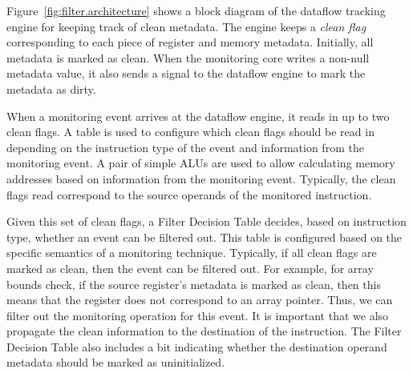 Figure~\ref{fig:filter.architecture} shows a block diagram of the dataflow
tracking engine for
keeping track of clean metadata. The engine keeps a \emph{clean flag}
corresponding to each piece of register and memory metadata. Initially, all
metadata is marked as clean.
When the monitoring core writes a non-null metadata value, it also sends a
signal to the dataflow engine to mark the metadata as dirty. 

When a monitoring event arrives at the dataflow engine,
it reads in up to two clean flags. A table is used to configure
which clean flags should be read in depending on the instruction type of
the event and information from the monitoring event. A pair of simple ALUs are
used to allow calculating memory addresses based on information from the
monitoring event. Typically, the clean flags read correspond to the
source operands of the monitored instruction.

Given this set of clean flags, a Filter Decision Table decides, based
on instruction type, whether an event can be filtered out. This table is
configured based on the specific semantics of a monitoring technique.
Typically, if all clean flags are marked as clean, then the
event can be filtered out. For example, for array bounds check, if the source
register's metadata is marked as clean, then this means that the
register does not correspond to an array pointer. Thus, we can filter out the
monitoring operation for this event. 
It is important that we also propagate the clean information to the destination
of the instruction.  The Filter Decision Table also includes a bit indicating
whether the destination operand metadata should be marked as uninitialized.

